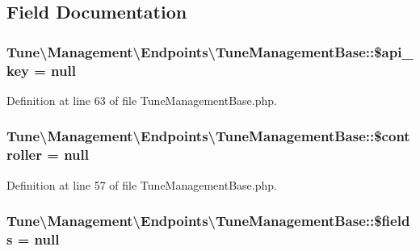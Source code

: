 \subsection{Field Documentation}
\hypertarget{classTune_1_1Management_1_1Endpoints_1_1TuneManagementBase_ac53649b4bc72055e1d55e53e0b6f244e}{
\subsubsection[{\$api\-\_\-key}]{\setlength{\rightskip}{0pt plus 5cm}Tune\textbackslash{}\-Management\textbackslash{}\-Endpoints\textbackslash{}\-Tune\-Management\-Base\-::\$api\-\_\-key = null\hspace{0.3cm}{\ttfamily [protected]}}}\label{classTune_1_1Management_1_1Endpoints_1_1TuneManagementBase_ac53649b4bc72055e1d55e53e0b6f244e}


Definition at line 63 of file Tune\-Management\-Base.\-php.

\hypertarget{classTune_1_1Management_1_1Endpoints_1_1TuneManagementBase_a8a73dbafcc91b04d7f1a7e2aaa9b486a}{
\subsubsection[{\$controller}]{\setlength{\rightskip}{0pt plus 5cm}Tune\textbackslash{}\-Management\textbackslash{}\-Endpoints\textbackslash{}\-Tune\-Management\-Base\-::\$controller = null\hspace{0.3cm}{\ttfamily [protected]}}}\label{classTune_1_1Management_1_1Endpoints_1_1TuneManagementBase_a8a73dbafcc91b04d7f1a7e2aaa9b486a}


Definition at line 57 of file Tune\-Management\-Base.\-php.

\hypertarget{classTune_1_1Management_1_1Endpoints_1_1TuneManagementBase_a215be5184c46eee7b2b3febaba85f91b}{
\subsubsection[{\$fields}]{\setlength{\rightskip}{0pt plus 5cm}Tune\textbackslash{}\-Management\textbackslash{}\-Endpoints\textbackslash{}\-Tune\-Management\-Base\-::\$fields = null\hspace{0.3cm}{\ttfamily [protected]}}}\label{classTune_1_1Management_1_1Endpoints_1_1TuneManagementBase_a215be5184c46eee7b2b3febaba85f91b}


